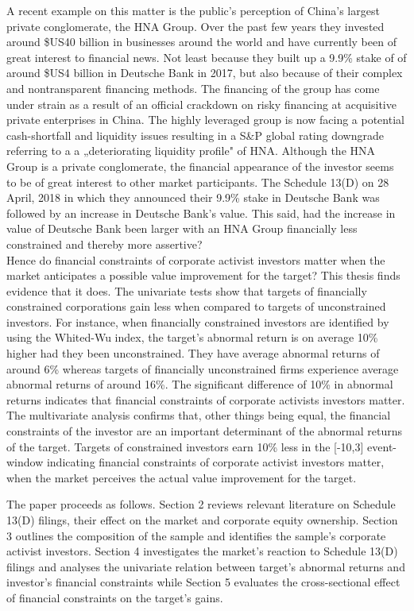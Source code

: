 \documentclass[12pt]{article}
\begin{document}
A recent example on this matter is the public's perception of China's largest private conglomerate, the HNA Group. Over the past few years they invested around \$US40 billion in businesses around the world and have currently been of great interest to financial news. Not least because they built up a 9.9\% stake of of around \$US4 billion in Deutsche Bank in 2017, but also because of their complex and nontransparent financing methods.
The financing of the group has come under strain as a result of an official crackdown on risky financing at acquisitive private enterprises in China. The highly leveraged group is now facing a potential cash-shortfall and liquidity issues resulting in a S\&P global rating downgrade referring to a a „deteriorating liquidity profile" of HNA. Although the HNA Group is a private conglomerate, the financial appearance of the investor seems to be of great interest to other market participants. The Schedule 13(D) on 28 April, 2018 in which they announced their 9.9\% stake in Deutsche Bank was followed by an increase in Deutsche Bank's value. This said, had the increase in value of Deutsche Bank been larger with an HNA Group financially less constrained and thereby more assertive?\\ 
Hence do financial constraints of corporate activist investors matter when the market anticipates a possible value improvement for the target? This thesis finds evidence that it does. The univariate tests show that targets of financially constrained corporations gain less when compared to targets of unconstrained investors. For instance, when financially constrained investors are identified by using the Whited-Wu index, the target's abnormal return is on average 10\% higher had they been unconstrained. They have average abnormal returns of around 6\% whereas targets of financially unconstrained firms experience average abnormal returns of around 16\%. The significant difference of 10\% in abnormal returns indicates that financial constraints of corporate activists investors matter. The multivariate analysis confirms that, other things being equal, the financial constraints of the investor are an important determinant of the abnormal returns of the target. Targets of constrained investors earn 10\% less in the [-10,3] event-window indicating financial constraints of corporate activist investors matter, when the market perceives the actual value improvement for the target. 

The paper proceeds as follows. Section 2 reviews relevant literature on Schedule 13(D) filings, their effect on the market and corporate equity ownership. Section 3 outlines the composition of the sample and identifies the sample's corporate activist investors. Section 4 investigates the market's reaction to Schedule 13(D) filings and analyses the univariate relation between target's abnormal returns and investor's financial constraints while Section 5 evaluates the cross-sectional effect of financial constraints on the target's gains.
\end{document}
